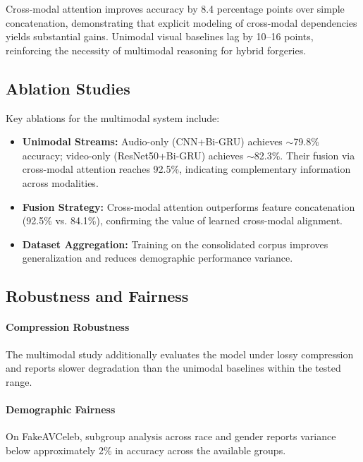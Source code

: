 Cross-modal attention improves accuracy by 8.4 percentage points over simple concatenation, demonstrating that explicit modeling of cross-modal dependencies yields substantial gains. Unimodal visual baselines lag by 10--16 points, reinforcing the necessity of multimodal reasoning for hybrid forgeries.

\subsection{Ablation Studies}
Key ablations for the multimodal system include:
\begin{itemize}
    \item \textbf{Unimodal Streams:} Audio-only (CNN+Bi-GRU) achieves $\sim$79.8\% accuracy; video-only (ResNet50+Bi-GRU) achieves $\sim$82.3\%. Their fusion via cross-modal attention reaches 92.5\%, indicating complementary information across modalities.
    \item \textbf{Fusion Strategy:} Cross-modal attention outperforms feature concatenation (92.5\% vs. 84.1\%), confirming the value of learned cross-modal alignment.
    \item \textbf{Dataset Aggregation:} Training on the consolidated corpus improves generalization and reduces demographic performance variance.
\end{itemize}

\subsection{Robustness and Fairness}
\paragraph{Compression Robustness}
The multimodal study additionally evaluates the model under lossy compression and reports slower degradation than the unimodal baselines within the tested range.

\paragraph{Demographic Fairness}
On FakeAVCeleb, subgroup analysis across race and gender reports variance below approximately 2\% in accuracy across the available groups.

